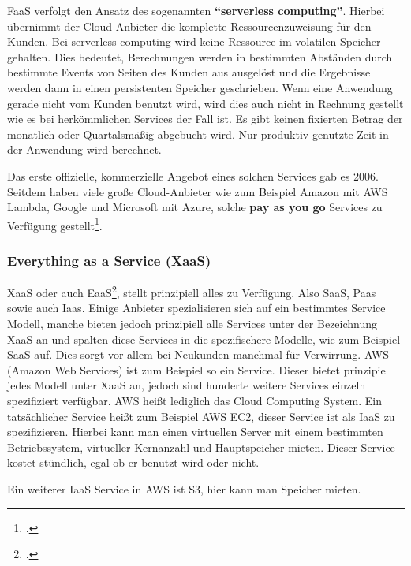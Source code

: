 FaaS verfolgt den Ansatz des sogenannten \textbf{"`serverless computing"'}. Hierbei übernimmt der Cloud-Anbieter die komplette Ressourcenzuweisung für den Kunden. Bei serverless computing wird keine Ressource im volatilen Speicher gehalten. Dies bedeutet, Berechnungen werden in bestimmten Abständen durch bestimmte Events von Seiten des Kunden aus ausgelöst und die Ergebnisse werden dann in einen persistenten Speicher geschrieben. Wenn eine Anwendung gerade nicht vom Kunden benutzt wird, wird dies auch nicht in Rechnung gestellt wie es bei herkömmlichen Services der Fall ist. Es gibt keinen fixierten Betrag der monatlich oder Quartalsmäßig abgebucht wird. Nur produktiv genutzte Zeit in der Anwendung wird berechnet.

Das erste offizielle, kommerzielle Angebot eines solchen Services gab es 2006. Seitdem haben viele große Cloud-Anbieter wie zum Beispiel Amazon mit AWS Lambda, Google und Microsoft mit Azure, solche \textbf{pay as you go} Services zu Verfügung gestellt\footcite{cloud-computing}.

\subsubsection{Everything as a Service (XaaS)}
XaaS oder auch EaaS\footcite{cloud-eaas}, stellt prinzipiell alles zu Verfügung. Also SaaS, Paas sowie auch Iaas. Einige Anbieter spezialisieren sich auf ein bestimmtes Service Modell, manche bieten jedoch prinzipiell alle Services unter der Bezeichnung XaaS an und spalten diese Services in die spezifischere Modelle, wie zum Beispiel SaaS auf. Dies sorgt vor allem bei Neukunden manchmal für Verwirrung. AWS (Amazon Web Services) ist zum Beispiel so ein Service. Dieser bietet prinzipiell jedes Modell unter XaaS an, jedoch sind hunderte weitere Services einzeln spezifiziert verfügbar. AWS heißt lediglich das Cloud Computing System. Ein tatsächlicher Service heißt zum Beispiel AWS EC2, dieser Service ist als IaaS zu spezifizieren.
Hierbei kann man einen virtuellen Server mit einem bestimmten Betriebssystem, virtueller Kernanzahl und Hauptspeicher mieten. Dieser Service kostet stündlich, egal ob er benutzt wird oder nicht.

Ein weiterer IaaS Service in AWS ist S3, hier kann man Speicher mieten.

